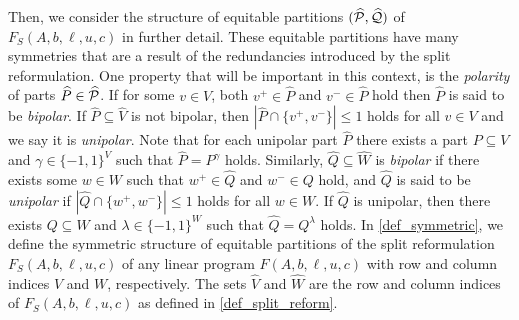 \documentclass[pdflatex,sn-mathphys-num]{sn-jnl}%
\theoremstyle{thmstyleone}%
\theoremstyle{thmstylethree}%
\theoremstyle{thmstyletwo}%
\begin{document}
Then, we consider the structure of equitable partitions $(\widehat{\mathcal{P}},\widehat{\mathcal{Q}})$ of $F_S(A,b,\ell,u,c)$ in further detail. 
These equitable partitions have many symmetries that are a result of the redundancies introduced by the split reformulation. One property that will be important in this context, is the \emph{polarity} of parts $\widehat{P}\in \widehat{\mathcal{P}}$. If for some $v\in V$, both $v^+\in \widehat{P}$ and $v^-\in \widehat{P}$ hold then $\widehat{P}$ is said to be \emph{bipolar}. If $\widehat{P}\subseteq \widehat{V}$ is not bipolar, then $|\widehat{P}\cap \{v^+,v^-\}|\leq 1$ holds for all $v\in V$ and we say it is \emph{unipolar}. Note that for each unipolar part $\widehat{P}$ there exists a part $P\subseteq V$ and $\gamma\in\{-1,1\}^V$ such that $\widehat{P} = P^\gamma$ holds. 
Similarly, $\widehat{Q}\subseteq \widehat{W}$ is \emph{bipolar} if there exists some $w\in W$ such that $w^+\in \widehat{Q}$ and $w^-\in Q$ hold, and $\widehat{Q}$ is said to be \emph{unipolar} if $|\widehat{Q}\cap \{w^+,w^-\}|\leq 1$ holds for all $w\in W$. If $\widehat{Q}$ is unipolar, then there exists $Q\subseteq W$ and $\lambda\in \{-1,1\}^W$ such that $\widehat{Q} = Q^\lambda$ holds. In \cref{def_symmetric}, we define the symmetric structure of equitable partitions of the split reformulation $F_S(A,b,\ell,u,c)$ of any linear program $F(A,b,\ell,u,c)$ with row and column indices $V$ and $W$, respectively. The sets $\widehat{V}$ and $\widehat{W}$ are the row and column indices of $F_S(A,b,\ell,u,c)$ as defined in \cref{def_split_reform}.
\end{document}
